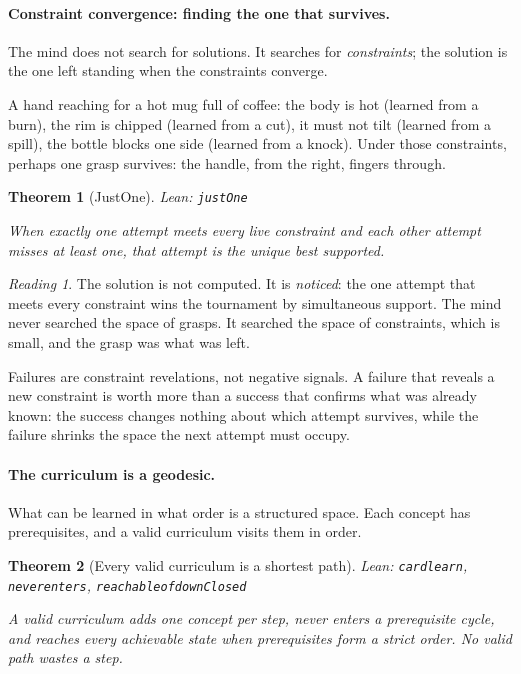 \documentclass[11pt]{article}
\newcommand{\leanus}{\textunderscore\allowbreak}
\newcommand{\lean}[1]{{\let\_\leanus\texttt{#1}}}
\newtheorem{theorem}{Theorem}[section]
\theoremstyle{remark}
\newtheorem*{reading}{Reading}
\begin{document}
\paragraph{Constraint convergence: finding the one that survives.}

The mind does not search for solutions. It searches for \emph{constraints}; the
solution is the one left standing when the constraints converge.

A hand reaching for a hot mug full of coffee: the body is hot (learned from a burn), the
rim is chipped (learned from a cut), it must not tilt (learned from a spill), the bottle
blocks one side (learned from a knock). Under those constraints, perhaps one grasp survives:
the handle, from the right, fingers through.

\begin{theorem}[JustOne]
{\small\sloppy Lean: \lean{justOne}\par}
When exactly one attempt meets every live constraint and each other attempt misses at
least one, that attempt is the unique best supported.
\end{theorem}

\begin{reading}
The solution is not computed. It is \emph{noticed}: the one attempt that meets every
constraint wins the tournament by simultaneous support. The mind never searched the space
of grasps. It searched the space of constraints, which is small, and the grasp was what
was left.

Failures are constraint revelations, not negative signals. A failure that reveals a new
constraint is worth more than a success that confirms what was already known: the success
changes nothing about which attempt survives, while the failure shrinks the space the next
attempt must occupy.
\end{reading}

\paragraph{The curriculum is a geodesic.}

What can be learned in what order is a structured space. Each concept has prerequisites,
and a valid curriculum visits them in order.

\begin{theorem}[Every valid curriculum is a shortest path]
{\small\sloppy Lean: \lean{card\_learn}, \lean{never\_enters},
\lean{reachable\_of\_downClosed}\par}
A valid curriculum adds one concept per step, never enters a prerequisite cycle, and
reaches every achievable state when prerequisites form a strict order. No valid path
wastes a step.
\end{theorem}
\end{document}

